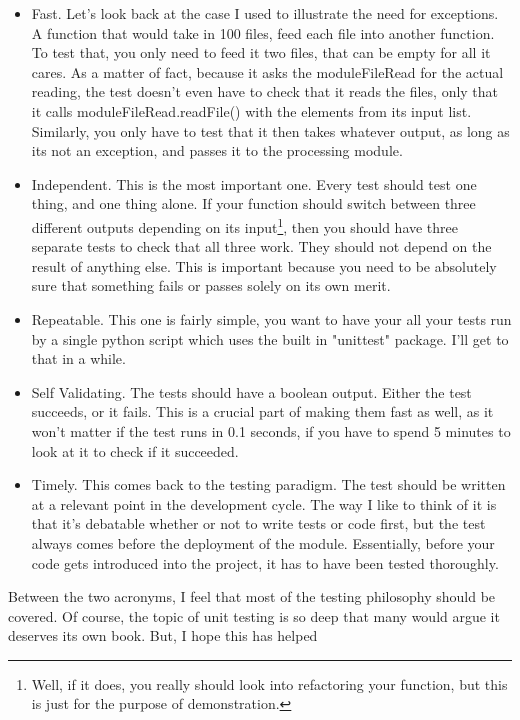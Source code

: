 \documentclass[10pt,a4paper]{article}
\begin{document}
\begin{itemize} 
\item Fast. Let's look back at the case I used to illustrate the need for exceptions. A function that would take in 100 files, feed each file into another function. To test that, you only need to feed it two files, that can be empty for all it cares. As a matter of fact, because it asks the moduleFileRead for the actual reading, the test doesn't even have to check that it reads the files, only that it calls moduleFileRead.readFile() with the elements from its input list. Similarly, you only have to test that it then takes whatever output, as long as its not an exception, and passes it to the processing module. 
\item Independent. This is the most important one. Every test should test one thing, and one thing alone. If your function should switch between three different outputs depending on its input\footnote{Well, if it does, you really should look into refactoring your function, but this is just for the purpose of demonstration.}, then you should have three separate tests to check that all three work. They should not depend on the result of anything else. This is important because you need to be absolutely sure that something fails or passes solely on its own merit.
\item Repeatable. This one is fairly simple, you want to have your all your tests run by a single python script which uses the built in "unittest" package. I'll get to that in a while.
\item Self Validating. The tests should have a boolean output. Either the test succeeds, or it fails. This is a crucial part of making them fast as well, as it won't matter if the test runs in 0.1 seconds, if you have to spend 5 minutes to look at it to check if it succeeded.
\item Timely. This comes back to the testing paradigm. The test should be written at a relevant point in the development cycle. The way I like to think of it is that it's debatable whether or not to write tests or code first, but the test always comes before the deployment of the module. Essentially, before your code gets introduced into the project, it has to have been tested thoroughly.  
\end{itemize}

Between the two acronyms, I feel that most of the testing philosophy should be covered. Of course, the topic of unit testing is so deep that many would argue it deserves its own book. But, I hope this has helped
\end{document}
